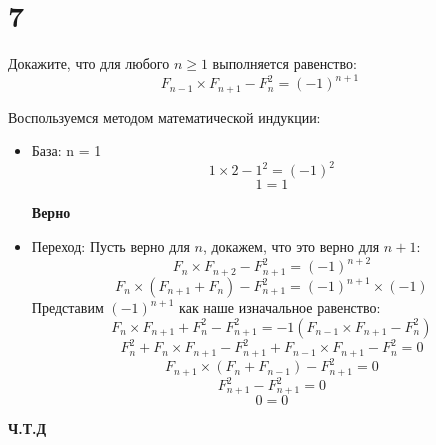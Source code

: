 \documentclass[a4paper,12pt]{article}
\begin{document}
\section*{7}
Докажите, что для любого $ n \geq 1 $ выполняется равенство:
\[
F_{n-1} \times F_{n+1} - F^2_{n} = (-1)^{n+1}
\]
\begin{center}
Воспользуемся методом математической индукции:
\end{center}
\begin{itemize}
\item База: n = 1
\[
1 \times 2 - 1^2 = (-1)^2
\]
\[
1 = 1
\]
\begin{center}
\textbf{Верно}
\end{center}
\item Переход:
Пусть верно для $n$, докажем, что это верно для $n+1$:
\[
F_n \times F_{n+2} - F^2_{n+1} = (-1)^{n+2}
\]
\[
F_n\times(F_{n+1} + F_n) - F^2_{n+1} = (-1)^{n+1} \times (-1)
\]
Представим $(-1)^{n+1}$ как наше изначальное равенство:
\[
F_n \times F_{n+1} + F^2_n - F^2_{n+1} = -1(F_{n-1}\times F_{n+1} - F^2_n)
\]
\[
F^2_n + F_n \times F_{n+1} - F^2_{n+1}+ F_{n-1}\times F_{n+1} - F^2_n = 0\]
\[
F_{n+1} \times (F_n + F_{n-1}) - F^2_{n+1} = 0
\]
\[
F^2_{n+1} - F^2_{n+1} = 0
\]
\[
0 = 0
\]
\end{itemize}
\begin{center}
\textbf{Ч.Т.Д}
\end{center}
\end{document}
